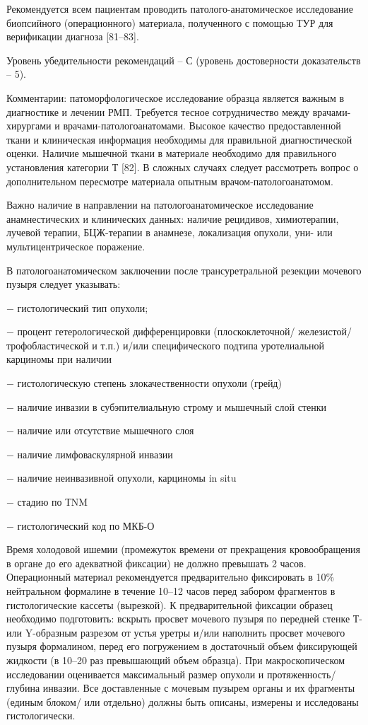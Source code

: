 Рекомендуется всем пациентам проводить патолого-анатомическое исследование биопсийного (операционного) материала, полученного с помощью ТУР для верификации диагноза [81–83].

Уровень убедительности рекомендаций – С (уровень достоверности доказательств – 5).

Комментарии: патоморфологическое исследование образца является важным в диагностике и лечении РМП. Требуется тесное сотрудничество между врачами-хирургами и врачами-патологоанатомами. Высокое качество предоставленной ткани и клиническая информация необходимы для правильной диагностической оценки. Наличие мышечной ткани в материале необходимо для правильного установления категории Т [82]. В сложных случаях следует рассмотреть вопрос о дополнительном пересмотре материала опытным врачом-патологоанатомом.

Важно наличие в направлении на патологоанатомическое исследование анамнестических и клинических данных: наличие рецидивов, химиотерапии, лучевой терапии, БЦЖ-терапии в анамнезе, локализация опухоли, уни- или мультицентрическое поражение.

В патологоанатомическом заключении после трансуретральной резекции мочевого пузыря следует указывать:

− гистологический тип опухоли;

− процент гетерологической дифференцировки (плоскоклеточной/ железистой/трофобластической и т.п.) и/или специфического подтипа уротелиальной карциномы при наличии

− гистологическую степень злокачественности опухоли (грейд)

− наличие инвазии в субэпителиальную строму и мышечный слой стенки

− наличие или отсутствие мышечного слоя

− наличие лимфоваскулярной инвазии

− наличие неинвазивной опухоли, карциномы in situ

− стадию по ТNM

− гистологический код по МКБ-О

Время холодовой ишемии (промежуток времени от прекращения кровообращения в органе до его адекватной фиксации) не должно превышать 2 часов.  Операционный материал рекомендуется предварительно фиксировать в 10\% нейтральном формалине в течение 10–12 часов перед забором фрагментов в гистологические кассеты (вырезкой). К предварительной фиксации образец необходимо подготовить: вскрыть просвет мочевого пузыря по передней стенке Т- или Y-образным разрезом от устья уретры и/или наполнить просвет мочевого пузыря формалином, перед его погружением в достаточный  объем фиксирующей жидкости (в 10–20 раз превышающий объем образца). При макроскопическом исследовании оценивается максимальный размер опухоли и протяженность/глубина инвазии. Все доставленные с мочевым пузырем органы и их фрагменты (единым блоком/ или отдельно) должны быть описаны, измерены и исследованы гистологически.

